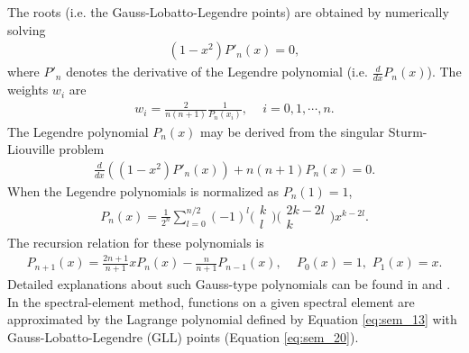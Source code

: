             The roots (i.e. the Gauss-Lobatto-Legendre points) are obtained by numerically solving
            \begin{align} \label{eq:sem_20}
                (1-x^2)P'_n(x)=0,
            \end{align}
            where $P'_n$ denotes the derivative of the Legendre polynomial (i.e. $\frac{d}{dx}P_n(x)$). The weights $w_i$ are
            \begin{align} \label{eq:sem_21}
                w_i=\frac{2}{n(n+1)}\frac{1}{P_n(x_i)},\,\,\,\,\,\,\,i=0,1,\cdots,n.
            \end{align}
            The Legendre polynomial $P_n(x)$ may be derived from the singular Sturm-Liouville problem
            \begin{align} \label{eq:sem_22}
                \frac{d}{dx}((1-x^2)P'_n(x))+n(n+1)P_n(x)=0.
            \end{align}
            When the Legendre polynomials is normalized as $P_n(1)=1$,
            \begin{align} \label{eq:sem_22_a}
                P_n(x)=\frac{1}{2^n}\sum_{l=0}^{n/2}(-1)^l \Biggl( \begin{matrix}k \\ l \end{matrix}\Biggr)  \Biggl( \begin{matrix}2k-2l \\ k \end{matrix}
\Biggr) x^{k-2l}.
            \end{align}
            The recursion relation for these polynomials is
            \begin{align} \label{eq:sem_23}
                P_{n+1}(x)=\frac{2n+1}{n+1}xP_n(x)-\frac{n}{n+1}P_{n-1}(x),\,\,\,\,\,\,\,P_0(x)=1,\,\,P_1(x)=x.
            \end{align}
            Detailed explanations about such Gauss-type polynomials can be found in \textcite{Davis1984Methodsofnumerical} and \textcite{Canuto2011Spectralmethods}.
            In the spectral-element method, functions on a given spectral element are approximated by the Lagrange polynomial defined by Equation \ref{eq:sem_13}
with Gauss-Lobatto-Legendre (GLL) points (Equation \ref{eq:sem_20}).

